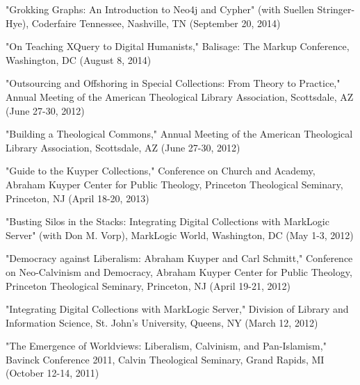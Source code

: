\documentclass[]{res} %
\begin{document}
\begin{resume}
\begin{hangparas}{.25in}{1}"Grokking Graphs: An Introduction to Neo4j and Cypher" (with Suellen Stringer-Hye), Coderfaire Tennessee, Nashville, TN (September 20, 2014)\end{hangparas}

\begin{hangparas}{.25in}{1}"On Teaching XQuery to Digital Humanists," Balisage: The Markup Conference, Washington, DC (August 8, 2014)\end{hangparas}

\begin{hangparas}{.25in}{1}"Outsourcing and Offshoring in Special Collections: From Theory to Practice," Annual Meeting of the American Theological Library Association, Scottsdale, AZ (June 27-30, 2012)\end{hangparas}

\begin{hangparas}{.25in}{1}"Building a Theological Commons," Annual Meeting of the American Theological Library Association, Scottsdale, AZ (June 27-30, 2012)\end{hangparas}

\begin{hangparas}{.25in}{1}"Guide to the Kuyper Collections," Conference on Church and Academy, Abraham Kuyper Center for Public Theology, Princeton Theological Seminary, Princeton, NJ (April 18-20, 2013)\end{hangparas}

\begin{hangparas}{.25in}{1}"Busting Silos in the Stacks: Integrating Digital Collections with MarkLogic Server" (with Don M. Vorp), MarkLogic World, Washington, DC (May 1-3, 2012)\end{hangparas}

\begin{hangparas}{.25in}{1}"Democracy against Liberalism: Abraham Kuyper and Carl Schmitt," Conference on Neo-Calvinism and Democracy, Abraham Kuyper Center for Public Theology, Princeton Theological Seminary, Princeton, NJ (April 19-21, 2012)\end{hangparas}

\begin{hangparas}{.25in}{1}"Integrating Digital Collections with MarkLogic Server," Division of Library and Information Science, St. John’s University, Queens, NY (March 12, 2012)\end{hangparas}

\begin{hangparas}{.25in}{1}"The Emergence of Worldviews: Liberalism, Calvinism, and Pan-Islamism," Bavinck Conference 2011, Calvin Theological Seminary, Grand Rapids, MI (October 12-14, 2011)\end{hangparas}


\end{resume}
\end{document}
